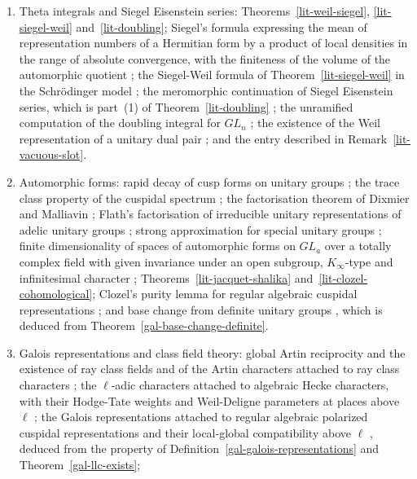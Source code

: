 \begin{theorem}
\begin{enumerate}
  description of the cuspidal characters of $GL_d(\mathbf F_g)$
  (Theorem~\ref{lit-green-cuspidal} and
  Corollary~\ref{lit-green-labelled}).
\item Theta integrals and Siegel Eisenstein series:
  Theorems~\ref{lit-weil-siegel}, \ref{lit-siegel-weil}
  and~\ref{lit-doubling}; Siegel's formula expressing the mean of
  representation numbers of a Hermitian form by a product of local densities
  in the range of absolute convergence, with the finiteness of the volume of
  the automorphic quotient \cite{Wei65,BHC62}; the Siegel-Weil formula of
  Theorem~\ref{lit-siegel-weil} in the Schrödinger model \cite{Ich07}; the
  meromorphic continuation of Siegel Eisenstein series, which is part~(1) of
  Theorem~\ref{lit-doubling} \cite{Lan76,MW95}; the unramified computation of
  the doubling integral for $GL_n$ \cite{GPSR87,LR05}; the existence of the
  Weil representation of a unitary dual pair \cite{Kud94,HKS96}; and the entry
  described in Remark~\ref{lit-vacuous-slot}.
\item Automorphic forms: rapid decay of cusp forms on unitary groups
  \cite{HC68,MW95}; the trace class property of the cuspidal spectrum
  \cite{GGPS69}; the factorisation theorem of Dixmier and Malliavin
  \cite{DM78}; Flath's factorisation of irreducible unitary representations of
  adelic unitary groups \cite{Fla79}; strong approximation for special unitary
  groups \cite{Kne65,PR94}; finite dimensionality of spaces of automorphic forms
  on $GL_a$ over a totally complex field with given invariance under an open
  subgroup, $K_\infty$-type and infinitesimal character \cite{HC68,BJ79};
  Theorems~\ref{lit-jacquet-shalika} and~\ref{lit-clozel-cohomological};
  Clozel's purity lemma for regular algebraic cuspidal representations
  \cite[Lemme~4.9]{Clo90}; and base change from definite unitary groups
  \cite{Lab11}, which is deduced from Theorem~\ref{gal-base-change-definite}.
\item Galois representations and class field theory: global Artin reciprocity
  and the existence of ray class fields and of the Artin characters attached
  to ray class characters \cite[Chapter~VI]{Neu99}; the $\ell$-adic characters
  attached to algebraic Hecke characters, with their Hodge-Tate weights and
  Weil-Deligne parameters at places above $\ell$ \cite{Ser68,Fon94}; the
  Galois representations attached to regular algebraic polarized cuspidal
  representations and their local-global compatibility above $\ell$
  \cite{CH13,BLGGT14,Car14}, deduced from the property of
  Definition~\ref{gal-galois-representations} and Theorem~\ref{gal-llc-exists};

\end{enumerate}
\end{theorem}
